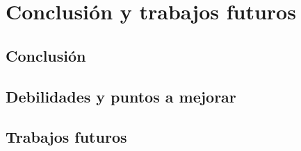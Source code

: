 \chapter{Conclusión y trabajos futuros}

\section{Conclusión}

\section{Debilidades y puntos a mejorar}

\section{Trabajos futuros}